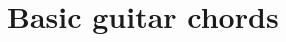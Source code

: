 \documentclass[oneside]{book}
\let\oldsection\section
\renewcommand{\section}{\newpage\oldsection}
\begin{document}
\tableofcontents

\section*{Basic guitar chords}
\hypertarget{Chords}{}


\end{document}
